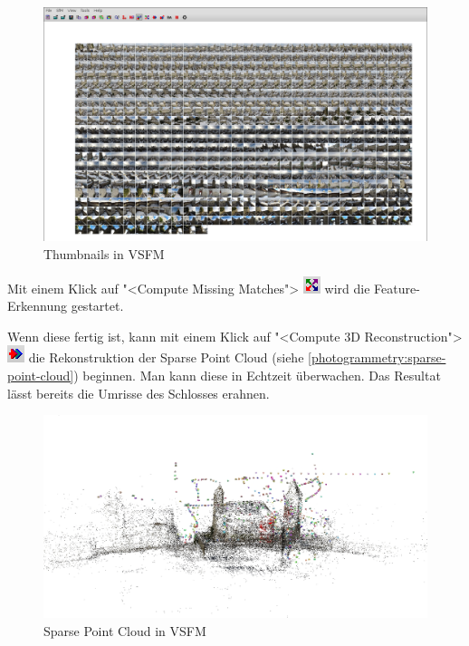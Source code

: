 \begin{figure}[H]
	\centering
	\includegraphics[width=\textwidth]{images/vsfm_thumbnails.png}
	\caption{Thumbnails in VSFM}
	\label{img:vsm_thumbnails}
\end{figure}

\noindent Mit einem Klick auf "<Compute Missing Matches">
\includegraphics[scale=0.75]{images/vsfm_icon_matches} wird die
Feature-Erkennung gestartet.

Wenn diese fertig ist, kann mit einem Klick auf "<Compute 3D Reconstruction">
\includegraphics[scale=0.75]{images/vsfm_icon_compute} die Rekonstruktion der
Sparse Point Cloud (siehe \autoref{photogrammetry:sparse-point-cloud}) beginnen.
Man kann diese in Echtzeit überwachen. Das Resultat lässt bereits die Umrisse
des Schlosses erahnen.

\begin{figure}[H]
	\centering
	\includegraphics[width=\textwidth]{images/sparse-matrix.jpg}
	\caption{Sparse Point Cloud in VSFM}
	\label{img:vsfm_sparse_cloud}
\end{figure}

